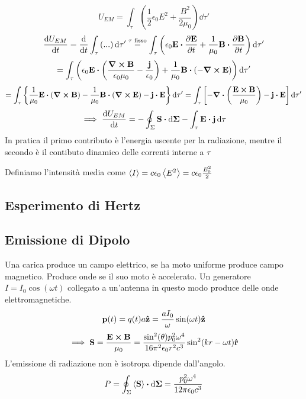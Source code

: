 \documentclass[12pt,a4paper]{article}
\begin{document}
\begin{equation*}
    U_{EM}= \int_\tau\left( \frac{1}{2}\epsilon_0E^2 + \frac{B^2}{2\mu_0} \right)\dd{\tau'}
\end{equation*}
\begin{equation*}
    \dv{U_{EM}}{t}= \dv{}{t}\int_\tau\left( ... \right)\dd{\tau'}\overset{\tau \text{ fisso}}{=}
    \int_\tau\left( \epsilon_0 \vb{E}\vdot\pdv{\vb{E}}{t}+ \frac{1}{\mu_0}\vb{B}\vdot\pdv{\vb{B}}{t}\right)\dd{\tau'}
\end{equation*}
\begin{equation*}
    =\int_\tau\left( \epsilon_0\vb{E}\vdot\left( \frac{\curl{\vb{B}}}{\epsilon_0\mu_0} -\frac{\vb{j}}{\epsilon_0} \right) + 
    \frac{1}{\mu_0}\vb{B}\vdot\left( - \curl{\vb{E}} \right) \right)\dd{\tau'}
\end{equation*}
\begin{equation*}
    = \int_\tau\left\{ \frac{1}{\mu_0}\vb{E}\vdot\left( \curl{\vb{B}} \right)-\frac{1}{\mu_0}\vb{B}\vdot\left( \curl{\vb{E}} \right)- \vb{j}\vdot\vb{E} \right\}\dd{\tau'}
    = \int_\tau \left[ - \div(\frac{\vb{E}\cp\vb{B}}{\mu_0})-\vb{j}\vdot\vb{E} \right]\dd{\tau'}
\end{equation*}
\begin{equation*}
    \implies\dv{U_{EM}}{t}= -\oint_\Sigma \vb{S}\vdot\dd{\vb{\Sigma}}-\int_\tau\vb{E}\vdot\vb{j}\dd{\tau}
\end{equation*}
In pratica il primo contributo è l'energia uscente per la radiazione, mentre il secondo è il contibuto dinamico delle correnti interne a $\tau$

Definiamo l'intensità media come $\expval{I}= c\epsilon_0\expval{E^2}= c \epsilon_0\frac{E_0^2}{2}$



\subsection{Esperimento di Hertz}
\subsection{Emissione di Dipolo}
Una carica produce un campo elettrico, se ha moto uniforme produce campo magnetico. Produce onde se il suo moto è accelerato.
Un generatore $I = I_0 \cos(\omega t)$ collegato a un'antenna in questo modo produce delle onde elettromagnetiche.
\begin{equation*}
    \vb{p}(t)=q(t)a\vu{z} = \frac{aI_0}{\omega}\sin(\omega t)\vu{z}  
\end{equation*}
\begin{equation*}
    \implies \vb{S}= \frac{\vb{E}\cp\vb{B}}{\mu_0} = \frac{\sin[2](\theta)p_0^2\omega^4}{16\pi^2\epsilon_0r^2c^3}\sin[2](kr-\omega t)\vu{r}
\end{equation*}
L'emissione di radiazione non è isotropa dipende dall'angolo.
\begin{equation*}
    P= \oint_\Sigma \expval{\vb{S}}\vdot\dd{\vb{\Sigma}}= \frac{p_0^2\omega^4}{12\pi\epsilon_0c^3}
\end{equation*}
\end{document}

